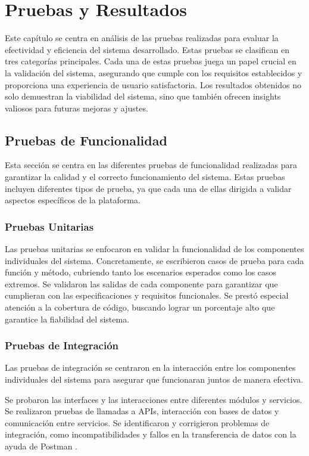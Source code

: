 \chapter{Pruebas y Resultados} \label{chap:resultadosExperimentales}

Este capítulo se centra en análisis de las pruebas realizadas para evaluar la efectividad y eficiencia del sistema desarrollado. Estas pruebas se clasifican en tres categorías principales. Cada una de estas pruebas juega un papel crucial en la validación del sistema, asegurando que cumple con los requisitos establecidos y proporciona una experiencia de usuario satisfactoria. Los resultados obtenidos no solo demuestran la viabilidad del sistema, sino que también ofrecen insights valiosos para futuras mejoras y ajustes.

\section{Pruebas de Funcionalidad}

Esta sección se centra en las diferentes pruebas de funcionalidad realizadas para garantizar la calidad y el correcto funcionamiento del sistema. Estas pruebas incluyen diferentes tipos de prueba, ya que cada una de ellas dirigida a validar aspectos específicos de la plataforma.

\subsection{Pruebas Unitarias}
Las pruebas unitarias se enfocaron en validar la funcionalidad de los componentes individuales del sistema. Concretamente, se escribieron casos de prueba para cada función y método, cubriendo tanto los escenarios esperados como los casos extremos. Se validaron las salidas de cada componente para garantizar que cumplieran con las especificaciones y requisitos funcionales. Se prestó especial atención a la cobertura de código, buscando lograr un porcentaje alto que garantice la fiabilidad del sistema.

\subsection{Pruebas de Integración}
Las pruebas de integración se centraron en la interacción entre los componentes individuales del sistema para asegurar que funcionaran juntos de manera efectiva.

Se probaron las interfaces y las interacciones entre diferentes módulos y servicios. Se realizaron pruebas de llamadas a APIs, interacción con bases de datos y comunicación entre servicios. Se identificaron y corrigieron problemas de integración, como incompatibilidades y fallos en la transferencia de datos con la ayuda de Postman \cite{postman}. 

